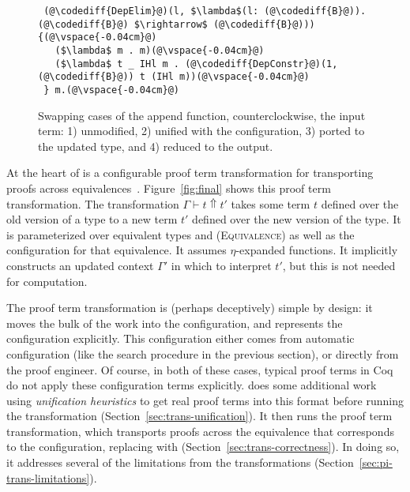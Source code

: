 \begin{figure*}
\begin{minipage}{0.49\textwidth}
\begin{lstlisting}
 (@\codediff{DepElim}@)(l, $\lambda$(l: (@\codediff{B}@)).(@\codediff{B}@) $\rightarrow$ (@\codediff{B}@))) {(@\vspace{-0.04cm}@)
   ($\lambda$ m . m)(@\vspace{-0.04cm}@)
   ($\lambda$ t _ IHl m . (@\codediff{DepConstr}@)(1, (@\codediff{B}@)) t (IHl m))(@\vspace{-0.04cm}@)
 } m.(@\vspace{-0.04cm}@)
\end{lstlisting}
\end{minipage}
\vspace{-0.3cm}
\caption{Swapping cases of the append function, counterclockwise, the input term: 1) unmodified, 2) unified with the configuration, 3) ported to the updated type, and 4) reduced to the output.}
\label{fig:appswap1}
\end{figure*}

At the heart of \toolnamec is a configurable proof term transformation for transporting
proofs across equivalences~\href{https://github.com/uwplse/pumpkin-pi/blob/v2.0.0/plugin/src/automation/lift/lift.ml}{}.
Figure~\ref{fig:final} shows this proof term transformation.
The transformation $\Gamma \vdash t \Uparrow t'$ takes some term $t$ defined over the old version of a type
to a new term $t'$ defined over the new version of the type.
It is parameterized over equivalent types \Aa and \B (\textsc{Equivalence})
as well as the configuration for that equivalence.
It assumes $\eta$-expanded functions. %
It implicitly constructs an updated context $\Gamma'$ in which to interpret $t'$, but this is not needed for computation.

The proof term transformation is (perhaps deceptively) simple by design:
it moves the bulk of the work into the configuration,
and represents the configuration explicitly.
This configuration either comes from automatic configuration (like the search procedure in the previous section),
or directly from the proof engineer.
Of course, in both of these cases, typical proof terms in Coq do not apply these configuration
terms explicitly.
\toolnamec does some additional work using \textit{unification heuristics} to get real proof terms into this format before 
running the transformation (Section~\ref{sec:trans-unification}).
It then runs the proof term transformation, which transports proofs across the equivalence that corresponds to the configuration,
replacing \Aa with \B (Section~\ref{sec:trans-correctness}).
In doing so, it addresses several of the limitations from the \sysname transformations (Section~\ref{sec:pi-trans-limitations}).

